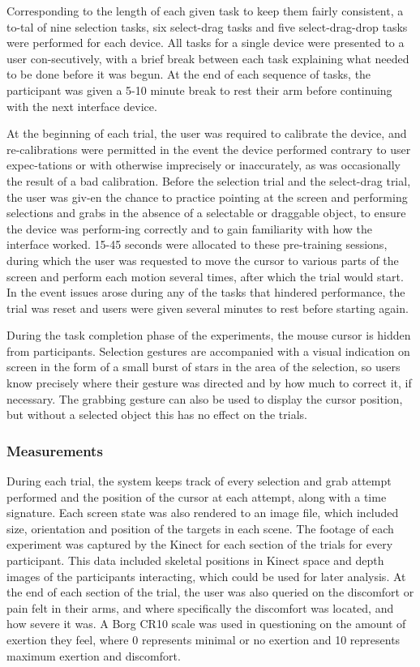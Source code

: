 Corresponding to the length of each given task to keep them fairly consistent, a to-tal of nine selection tasks, six select-drag tasks and five select-drag-drop tasks were performed for each device.  All tasks for a single device were presented to a user con-secutively, with a brief break between each task explaining what needed to be done before it was begun. At the end of each sequence of tasks, the participant was given a 5-10 minute break to rest their arm before continuing with the next interface device.

At the beginning of each trial, the user was required to calibrate the device, and re-calibrations were permitted in the event the device performed contrary to user expec-tations or with otherwise imprecisely or inaccurately, as was occasionally the result of a bad calibration. Before the selection trial and the select-drag trial, the user was giv-en the chance to practice pointing at the screen and performing selections and grabs in the absence of a selectable or draggable object, to ensure the device was perform-ing correctly and to gain familiarity with how the interface worked. 15-45 seconds were allocated to these pre-training sessions, during which the user was requested to move the cursor to various parts of the screen and perform each motion several times, after which the trial would start. In the event issues arose during any of the tasks that hindered performance, the trial was reset and users were given several minutes to rest before starting again.

During the task completion phase of the experiments, the mouse cursor is hidden from participants.  Selection gestures are accompanied with a visual indication on screen in the form of a small burst of stars in the area of the selection, so users know precisely where their gesture was directed and by how much to correct it, if necessary. The grabbing gesture can also be used to display the cursor position, but without a selected object this has no effect on the trials.

\subsubsection{Measurements}

During each trial, the system keeps track of every selection and grab attempt performed and the position of the cursor at each attempt, along with a time signature. Each screen state was also rendered to an image file, which included size, orientation and position of the targets in each scene. The footage of each experiment was captured by the Kinect for each section of the trials for every participant. This data included skeletal positions in Kinect space and depth images of the participants interacting, which could be used for later analysis. At the end of each section of the trial, the user was also queried on the discomfort or pain felt in their arms, and where specifically the discomfort was located, and how severe it was. A Borg CR10 scale  was used in questioning on the amount of exertion they feel, where 0 represents minimal or no exertion and 10 represents maximum exertion and discomfort. 

